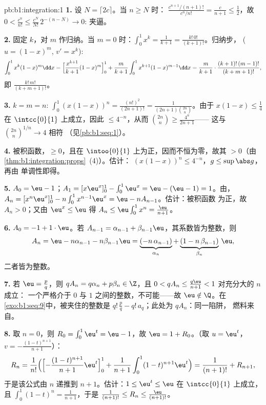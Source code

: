 \begin{solution}{pb:b1:integration:1}
\textbf{1.} 设 $N = \lceil 2c \rceil$。当 $n \geq N$ 时：
$\frac{c^{n+1}/(n+1)!}{c^n/n!} = \frac{c}{n+1} \leq \frac12$，故
$0 < \frac{c^n}{n!} \leq \frac{c^N}{N!}\,2^{-(n - N)} \to 0$:
夹逼。

\textbf{2.} 固定 $k$，对 $m$ 作归纳。当 $m = 0$ 时：$\int_0^1
x^k = \frac{1}{k+1} = \frac{k!\,0!}{(k+1)!}$。归纳步，
($u = (1-x)^m$, $v' = x^k$):
\[
\int_0^1 x^k (1-x)^m \dd x
= \Bigl[\frac{x^{k+1}}{k+1}(1-x)^m\Bigr]_0^1
+ \frac{m}{k+1}\int_0^1 x^{k+1}(1-x)^{m-1}\dd x
= \frac{m}{k+1}\cdot\frac{(k+1)!\,(m-1)!}{(k+m+1)!} ,
\]
即 $\frac{k!\,m!}{(k+m+1)!}$。

\textbf{3.} $k = m = n$: $\int_0^1 (x(1-x))^n =
\frac{(n!)^2}{(2n+1)!} = \frac{1}{(2n+1)\binom{2n}{n}}$。由于
$x(1-x) \leq \frac14$ 在 $\intcc{0}{1}$ 上成立，因此 $\leq
4^{-n}$，从而 $\binom{2n}{n} \geq \frac{4^n}{2n+1}$——
这与 $\binom{2n}{n}^{1/n} \to 4$ 相符
（见\cref{pb:b1:seq:1}）。

\textbf{4.} 被积函数，$\geq 0$，且在
$\intoo{0}{1}$ 上为正，因而不恒为零，故其
$> 0$（由\cref{thm:b1:integration:props}~(4)）。估计：
$(x(1-x))^n \leq 4^{-n}$，$g \leq \sup\abs g$，再由
单调性即得。

\textbf{5.} $A_0 = \eu - 1$；$A_1 = [x\eu^x]_0^1 - \int_0^1
\eu^x = \eu - (\eu - 1) = 1$。由，$A_n = [x^n \eu^x]_0^1 -
n\int_0^1 x^{n-1}\eu^x = \eu - n A_{n-1}$。估计：被积函数
为正，故 $A_n > 0$；又由 $\eu^x \leq \eu$ 得 $A_n \leq
\eu\int_0^1 x^n = \frac{\eu}{n+1}$。

\textbf{6.} $A_0 = -1 + 1\cdot\eu$。若 $A_{n-1} = \alpha_{n-1} +
\beta_{n-1}\eu$，其系数皆为整数，则
\[
A_n = \eu - n\alpha_{n-1} - n\beta_{n-1}\eu
= \underbrace{(-n\,\alpha_{n-1})}_{\alpha_n}
+ \underbrace{(1 - n\,\beta_{n-1})}_{\beta_n}\,\eu ,
\]
二者皆为整数。

\textbf{7.} 若 $\eu = \frac pq$，则 $q A_n = q\alpha_n + p\beta_n
\in \Z$，且 $0 < qA_n \leq \frac{q\eu}{n+1} < 1$ 对充分大的 $n$ 成立：
一个严格介于 $0$ 与 $1$ 之间的整数，不可能——故 $\eu
\notin \Q$。在\cref{exo:b1:seq:9}中，被夹住的整数是
$q!\,\frac pq - q!\,a_q$；此处为 $qA_n$：同一陷阱，
燃料来自。

\textbf{8.} 取 $n = 0$，则 $R_0 = \int_0^1 \eu^t = \eu - 1$，故 $\eu =
1 + R_0$。（取 $u = \eu^t$，$v = -\frac{(1-t)^{n+1}}{n+1}$）：
\[
R_n = \frac{1}{n!}\Bigl(\Bigl[-\frac{(1-t)^{n+1}}{n+1}
\eu^t\Bigr]_0^1 + \frac{1}{n+1}\int_0^1 (1-t)^{n+1}\eu^t\Bigr)
= \frac{1}{(n+1)!} + R_{n+1} ,
\]
于是该公式由 $n$ 递推到 $n + 1$。估计：$1 \leq
\eu^t \leq \eu$ 在 $\intcc{0}{1}$ 上成立，且 $\int_0^1 (1-t)^n =
\frac{1}{n+1}$，于是 $\frac{1}{(n+1)!} \leq R_n \leq
\frac{\eu}{(n+1)!}$。


\end{solution}
